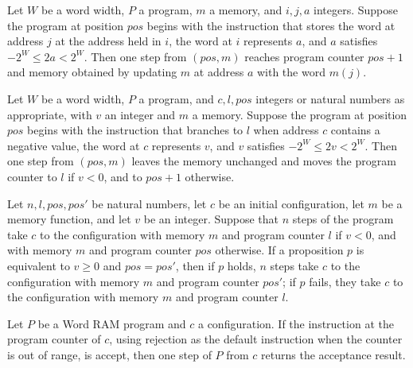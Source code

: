 \begin{theorem}
\label{WordRAM.steps_store}
\leanok
{}
Let $W$ be a word width, $P$ a program, $m$ a memory, and $i,j,a$ integers. Suppose the
program at position $pos$ begins with the instruction that stores the word at address
$j$ at the address held in $i$, the word at $i$ represents $a$, and $a$ satisfies $-2^W
\le 2a < 2^W$. Then one step from $(pos,m)$ reaches program counter $pos+1$ and memory
obtained by updating $m$ at address $a$ with the word $m(j)$.
\end{theorem}

\begin{theorem}
\label{WordRAM.steps_bltz}
\leanok
{}
Let $W$ be a word width, $P$ a program, and $c,l,pos$ integers or natural numbers as
appropriate, with $v$ an integer and $m$ a memory. Suppose the program at position $pos$
begins with the instruction that branches to $l$ when address $c$ contains a negative
value, the word at $c$ represents $v$, and $v$ satisfies $-2^W \le 2v < 2^W$. Then one
step from $(pos,m)$ leaves the memory unchanged and moves the program counter to $l$ if
$v<0$, and to $pos+1$ otherwise.
\end{theorem}

\begin{theorem}
\label{WordRAM.Steps.branch}
\leanok
{}
Let $n,l,pos,pos'$ be natural numbers, let $c$ be an initial configuration, let $m$ be a
memory function, and let $v$ be an integer. Suppose that $n$ steps of the program take
$c$ to the configuration with memory $m$ and program counter $l$ if $v<0$, and with
memory $m$ and program counter $pos$ otherwise. If a proposition $p$ is equivalent to
$v\ge 0$ and $pos=pos'$, then if $p$ holds, $n$ steps take $c$ to the configuration with
memory $m$ and program counter $pos'$; if $p$ fails, they take $c$ to the configuration
with memory $m$ and program counter $l$.
\end{theorem}

\begin{theorem}
\label{WordRAM.step_accept}
\leanok
{}
Let $P$ be a Word RAM program and $c$ a configuration. If the instruction at the program
counter of $c$, using rejection as the default instruction when the counter is out of
range, is accept, then one step of $P$ from $c$ returns the acceptance result.
\end{theorem}

